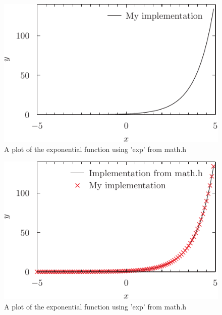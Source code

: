 \documentclass{article}
\begin{document}
\begin{figure}\label{fig:simple}
	\includegraphics{simple_exp_plot.pdf}
	\caption{A plot of the exponential function using 'exp' from math.h}
\end{figure}

\begin{figure}\label{fig:total}
	\includegraphics{total_exp_plot.pdf}
	\caption{A plot of the exponential function using 'exp' from math.h}
\end{figure}
\end{document}
